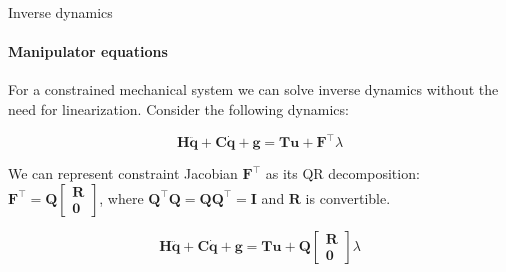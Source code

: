\documentclass{beamer}
\begin{document}
\begin{frame}{Inverse dynamics}
\framesubtitle{Manipulator equations}
\begin{flushleft}

For a constrained mechanical system we can solve inverse dynamics without the need for linearization. Consider the following dynamics:

\begin{equation}
    \mathbf{H}\ddot{\mathbf{q}} + \mathbf{C}\dot{\mathbf{q}} + \mathbf{g} = \mathbf{T}\mathbf{u} + \mathbf{F}^\top \lambda
\end{equation}

We can represent constraint Jacobian $\mathbf{F}^\top$ as its QR decomposition: $\mathbf{F}^\top = \mathbf{Q} \begin{bmatrix} \mathbf{R} \\ \mathbf{0}  \end{bmatrix}$, where $\mathbf{Q}^\top \mathbf{Q} = \mathbf{Q} \mathbf{Q}^\top = \mathbf{I}$ and $\mathbf{R}$ is convertible.

\begin{equation}
    \mathbf{H}\ddot{\mathbf{q}} + \mathbf{C}\dot{\mathbf{q}} + \mathbf{g} = \mathbf{T}\mathbf{u} + \mathbf{Q} \begin{bmatrix} \mathbf{R} \\ \mathbf{0}  \end{bmatrix} \lambda
\end{equation}


\end{flushleft}
\end{frame}
\end{document}
